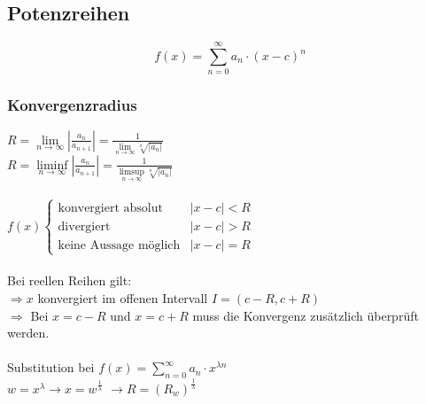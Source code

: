 \documentclass[6pt,a4paper]{scrartcl}
\newcommand{\abs}[1]{\ensuremath{\left\vert#1\right\vert}}
\newcommand{\Ra}[0]{\ensuremath{\Rightarrow}}
\begin{document}
\begin{multicols*}{4}
\subsection{Potenzreihen} %
\begin{equation*}
f(x)=\sum_{n=0}^\infty a_n \cdot (x-c)^n
\end{equation*}
\subsubsection{Konvergenzradius}
$R = \lim\limits_{n\rightarrow \infty} \abs{\frac{a_n}{a_{n+1}}}=\frac{1}{\lim\limits_{n\rightarrow \infty}\sqrt[n]{\abs{a_n}}}$ \\
$R =\liminf\limits_{n\rightarrow \infty} \abs{\frac{a_n}{a_{n+1}}}=\frac{1}{\limsup\limits_{n\rightarrow \infty}\sqrt[n]{\abs{a_n}}}$ \\ \\
$f(x)\begin{cases}
	\text{konvergiert absolut} & \abs{x-c} < R \\
	\text{divergiert} & \abs{x-c} > R \\
	\text{keine Aussage möglich} & \abs{x-c} = R
	\end{cases}$\\ \\
Bei reellen Reihen gilt: \\
$\Ra x$ konvergiert im offenen Intervall $I=(c-R,c+R)$ \\
$\Ra$ Bei $x=c-R$ und $x=c+R$ muss die Konvergenz zusätzlich überprüft werden.\\\\
Substitution bei $f(x)=\sum_{n=0}^\infty a_n \cdot x^{\lambda n}$ \\
$w=x^\lambda \rightarrow x=w^\frac{1}{\lambda}$
$\rightarrow R=\left(R_w\right)^\frac{1}{\lambda}$


\end{multicols*}
\end{document}

